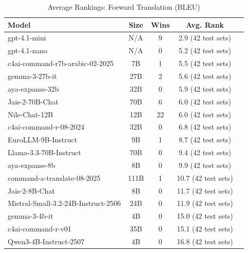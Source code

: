 \begin{table}[htbp]
\centering
\caption{Average Rankings: Forward Translation (BLEU)}
\label{tab:avg_rankings_bleu}
\begin{tabular}{l@{\hspace{3pt}}c@{\hspace{3pt}}c@{\hspace{3pt}}c@{\hspace{3pt}}c}
\toprule
Model & Size & Wins & Avg. Rank \\
\midrule
gpt-4.1-mini & N/A & 9 & 2.9 (42 test sets) \\
gpt-4.1-nano & N/A & 0 & 5.2 (42 test sets) \\
c4ai-command-r7b-arabic-02-2025 & 7B & 1 & 5.5 (42 test sets) \\
gemma-3-27b-it & 27B & 2 & 5.6 (42 test sets) \\
aya-expanse-32b & 32B & 0 & 5.9 (42 test sets) \\
Jais-2-70B-Chat & 70B & 6 & 6.0 (42 test sets) \\
Nile-Chat-12B & 12B & 22 & 6.0 (42 test sets) \\
c4ai-command-r-08-2024 & 32B & 0 & 6.8 (42 test sets) \\
EuroLLM-9B-Instruct & 9B & 1 & 8.7 (42 test sets) \\
Llama-3.3-70B-Instruct & 70B & 0 & 9.4 (42 test sets) \\
aya-expanse-8b & 8B & 0 & 9.9 (42 test sets) \\
command-a-translate-08-2025 & 111B & 1 & 10.7 (42 test sets) \\
Jais-2-8B-Chat & 8B & 0 & 11.7 (42 test sets) \\
Mistral-Small-3.2-24B-Instruct-2506 & 24B & 0 & 11.9 (42 test sets) \\
gemma-3-4b-it & 4B & 0 & 15.0 (42 test sets) \\
c4ai-command-r-v01 & 35B & 0 & 15.1 (42 test sets) \\
Qwen3-4B-Instruct-2507 & 4B & 0 & 16.8 (42 test sets) \\
\bottomrule
\end{tabular}
\end{table}